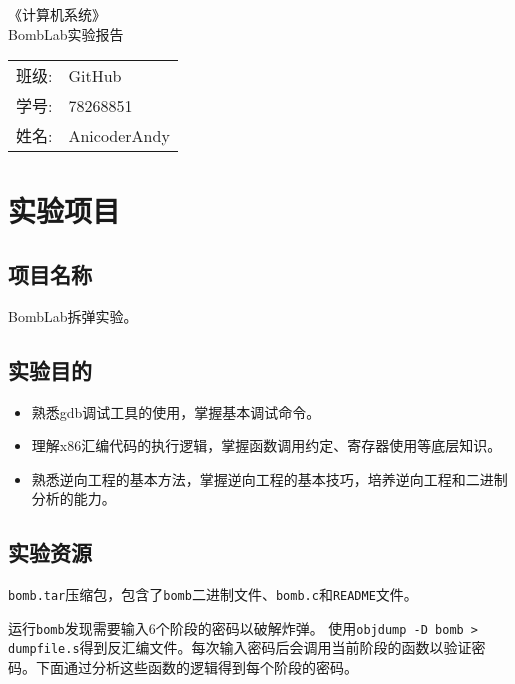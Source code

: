 \documentclass[a4paper, 11pt]{ctexart}
\let\oldsection\section
\renewcommand{\section}{\clearpage\oldsection}
\begin{document}
\sloppy
\begin{titlepage}
    \begin{center}
        \vspace*{5cm}
        \yahei{}《计算机系统》\\ \vspace{50pt}BombLab实验报告
        \vfill
        \begin{tabular}{ll}
            班级: & GitHub\\
            学号: & 78268851\\
            姓名: & AnicoderAndy\\
        \end{tabular}
    \end{center}
\end{titlepage}
\setcounter{page}{2}

\renewcommand{\contentsname}{\centering 目录}
\tableofcontents

\section{实验项目}
\setcounter{subsection}{0}
\subsection{项目名称}
BombLab拆弹实验。

\subsection{实验目的}
\begin{itemize}
    \item 熟悉gdb调试工具的使用，掌握基本调试命令。
    \item 理解x86汇编代码的执行逻辑，掌握函数调用约定、寄存器使用等底层知识。
    \item 熟悉逆向工程的基本方法，掌握逆向工程的基本技巧，培养逆向工程和二进制分析的能力。
\end{itemize}

\subsection{实验资源}
\texttt{bomb.tar}压缩包，包含了\texttt{bomb}二进制文件、\texttt{bomb.c}和\texttt{README}文件。

运行\texttt{bomb}发现需要输入6个阶段的密码以破解炸弹。
使用\texttt{objdump -D bomb > dumpfile.s}得到反汇编文件。每次输入密码后会调用当前阶段的函数以验证密码。下面通过分析这些函数的逻辑得到每个阶段的密码。
\end{document}

